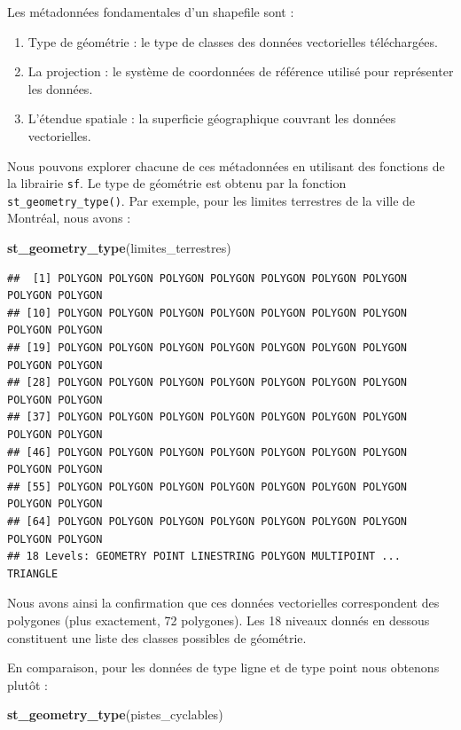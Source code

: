 \documentclass[]{article}
\newenvironment{Shaded}{\begin{snugshade}}{\end{snugshade}}
\newcommand{\KeywordTok}[1]{\textcolor[rgb]{0.13,0.29,0.53}{\textbf{#1}}}
\newcommand{\NormalTok}[1]{#1}
\providecommand{\tightlist}{%
  \setlength{\itemsep}{0pt}\setlength{\parskip}{0pt}}
\begin{document}
Les métadonnées fondamentales d'un shapefile sont :

\begin{enumerate}
\def\labelenumi{\arabic{enumi}.}
\tightlist
\item
  Type de géométrie : le type de classes des données vectorielles
  téléchargées.
\item
  La projection : le système de coordonnées de référence utilisé pour
  représenter les données.
\item
  L'étendue spatiale : la superficie géographique couvrant les données
  vectorielles.
\end{enumerate}

Nous pouvons explorer chacune de ces métadonnées en utilisant des
fonctions de la librairie \texttt{sf}. Le type de géométrie est obtenu
par la fonction \texttt{st\_geometry\_type()}. Par exemple, pour les
limites terrestres de la ville de Montréal, nous avons :

\begin{Shaded}
\begin{Highlighting}[]
\KeywordTok{st_geometry_type}\NormalTok{(limites_terrestres)}
\end{Highlighting}
\end{Shaded}

\begin{verbatim}
##  [1] POLYGON POLYGON POLYGON POLYGON POLYGON POLYGON POLYGON POLYGON POLYGON
## [10] POLYGON POLYGON POLYGON POLYGON POLYGON POLYGON POLYGON POLYGON POLYGON
## [19] POLYGON POLYGON POLYGON POLYGON POLYGON POLYGON POLYGON POLYGON POLYGON
## [28] POLYGON POLYGON POLYGON POLYGON POLYGON POLYGON POLYGON POLYGON POLYGON
## [37] POLYGON POLYGON POLYGON POLYGON POLYGON POLYGON POLYGON POLYGON POLYGON
## [46] POLYGON POLYGON POLYGON POLYGON POLYGON POLYGON POLYGON POLYGON POLYGON
## [55] POLYGON POLYGON POLYGON POLYGON POLYGON POLYGON POLYGON POLYGON POLYGON
## [64] POLYGON POLYGON POLYGON POLYGON POLYGON POLYGON POLYGON POLYGON POLYGON
## 18 Levels: GEOMETRY POINT LINESTRING POLYGON MULTIPOINT ... TRIANGLE
\end{verbatim}

Nous avons ainsi la confirmation que ces données vectorielles
correspondent des polygones (plus exactement, 72 polygones). Les 18
niveaux donnés en dessous constituent une liste des classes possibles de
géométrie.

En comparaison, pour les données de type ligne et de type point nous
obtenons plutôt :

\begin{Shaded}
\begin{Highlighting}[]
\KeywordTok{st_geometry_type}\NormalTok{(pistes_cyclables)}
\end{Highlighting}
\end{Shaded}
\end{document}
